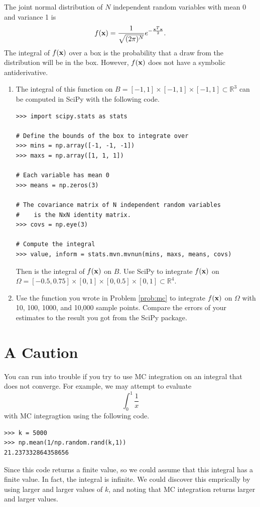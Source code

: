 \begin{problem}
The joint normal distribution of $N$ independent random variables with mean 0 and variance 1 is
\[
f({\bf x}) = \frac{1}{\sqrt{(2 \pi)^N}} e^{- \frac{{\bf x}^T{\bf x}}{2}}.
\]
The integral of $f({\bf x})$ over a box is the probability that a draw from the distribution will be in the box.
However, $f({\bf x})$ does not have a symbolic antiderivative.
\begin{enumerate}
\item The integral of this function on $B = [-1,1]\times [-1,1]\times[-1,1] \subset \mathbb{R}^3$ can be computed in SciPy with the following code.
\begin{lstlisting}
>>> import scipy.stats as stats

# Define the bounds of the box to integrate over
>>> mins = np.array([-1, -1, -1])
>>> maxs = np.array([1, 1, 1])

# Each variable has mean 0
>>> means = np.zeros(3)

# The covariance matrix of N independent random variables
#    is the NxN identity matrix.
>>> covs = np.eye(3)

# Compute the integral
>>> value, inform = stats.mvn.mvnun(mins, maxs, means, covs)
\end{lstlisting}
Then  is the integral of $f({\bf x})$ on $B$.
Use SciPy to integrate $f({\bf x})$ on $\Omega=[-0.5, 0.75]\times[0,1]\times[0, 0.5]\times[0,1] \subset \mathbb{R}^4$.

\item Use the function  you wrote in Problem \ref{prob:mc} to integrate $f({\bf x})$ on $\Omega$ with 10, 100, 1000, and 10,000 sample points. 
Compare the errors of your estimates to the result you got from the SciPy package.
\end{enumerate}
\end{problem}


\section*{A Caution}
You can run into trouble if you try to use MC integration on an integral that does not converge.
For example, we may attempt to evaluate
\[
\int_0^1 \frac{1}{x}
\]
with MC integragtion using the following code.
\begin{lstlisting}
>>> k = 5000
>>> np.mean(1/np.random.rand(k,1))
21.237332864358656
\end{lstlisting}

Since this code returns a finite value, so we could assume that this integral has a finite value.
In fact, the integral is infinite.
We could discover this emprically by using larger and larger values of $k$, and noting that MC integration returns larger and larger values.

